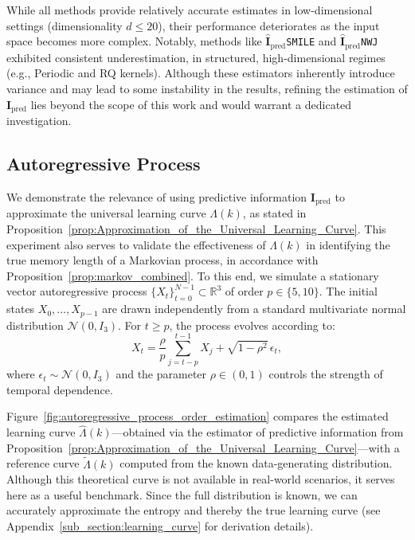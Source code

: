 \documentclass{article}
\begin{document}
While all methods provide relatively accurate estimates in low-dimensional settings (dimensionality $d \leq 20$), their performance deteriorates as the input space becomes more complex. Notably, methods like $\hat{\mathbf{I}}_{\text{pred}}$\text{-}\texttt{SMILE} and $\hat{\mathbf{I}}_{\text{pred}}$\text{-}\texttt{NWJ} exhibited consistent underestimation, in structured, high-dimensional regimes (e.g., Periodic and RQ kernels). Although these estimators inherently introduce variance and may lead to some instability in the results, refining the estimation of $\mathbf{I}_{\text{pred}}$ lies beyond the scope of this work and would warrant a dedicated investigation.
\subsection{Autoregressive Process}

We demonstrate the relevance of using predictive information $\mathbf{I}_{\text{pred}}$ to approximate the universal learning curve $\Lambda(k)$, as stated in Proposition~\ref{prop:Approximation_of_the_Universal_Learning_Curve}. This experiment also serves to validate the effectiveness of $\Lambda(k)$ in identifying the true memory length of a Markovian process, in accordance with Proposition~\ref{prop:markov_combined}. To this end, we simulate a stationary vector autoregressive process $\{X_t\}_{t=0}^{N-1} \subset \mathbb{R}^3$ of order $p \in \{5, 10\}$. The initial states $X_0, \dots, X_{p-1}$ are drawn independently from a standard multivariate normal distribution $\mathcal{N}(0, I_3)$. For $t \geq p$, the process evolves according to:
\begin{equation}
    X_t = \frac{\rho}{p} \sum_{j=t-p}^{t-1} X_j + \sqrt{1 - \rho^2} \, \epsilon_t,
    \label{eq:AR6}
\end{equation}
where $\epsilon_t \sim \mathcal{N}(0, I_3)$ and the parameter $\rho \in (0,1)$ controls the strength of temporal dependence.

Figure~\ref{fig:autoregressive_process_order_estimation} compares the estimated learning curve $\hat{\Lambda}(k)$—obtained via the estimator of predictive information from Proposition~\ref{prop:Approximation_of_the_Universal_Learning_Curve}—with a reference curve $\tilde{\Lambda}(k)$ computed from the known data-generating distribution. Although this theoretical curve is not available in real-world scenarios, it serves here as a useful benchmark. Since the full distribution is known, we can accurately approximate the entropy and thereby the true learning curve (see Appendix~\ref{sub_section:learning_curve} for derivation details).
\end{document}
